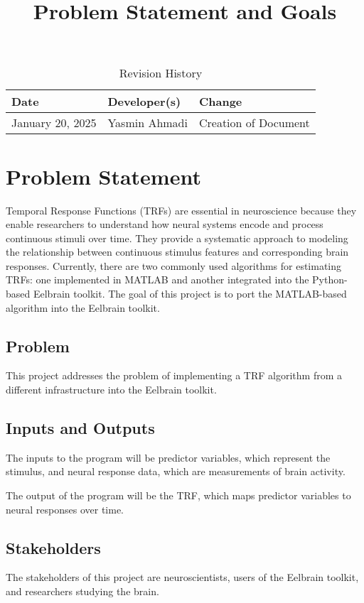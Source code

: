 \documentclass{article}
\title{Problem Statement and Goals\\\progname}
\author{\authname}
\date{}
\begin{document}
\maketitle

\begin{table}[hp]
\caption{Revision History} \label{TblRevisionHistory}
\begin{tabularx}{\textwidth}{llX}
\toprule
\textbf{Date} & \textbf{Developer(s)} & \textbf{Change}\\
\midrule
January 20, 2025 & Yasmin Ahmadi & Creation of Document\\


\bottomrule
\end{tabularx}
\end{table}

\section{Problem Statement}

Temporal Response Functions (TRFs) are essential in neuroscience because they enable researchers to understand how neural systems encode and process continuous stimuli over time. They provide a systematic approach to modeling the relationship between continuous stimulus features and corresponding brain responses. Currently, there are two commonly used algorithms for estimating TRFs: one implemented in MATLAB and another integrated into the Python-based Eelbrain toolkit. The goal of this project is to port the MATLAB-based algorithm into the Eelbrain toolkit.

\subsection{Problem}
This project addresses the problem of implementing a TRF algorithm from a different infrastructure into the Eelbrain toolkit.

\subsection{Inputs and Outputs}

The inputs to the program will be predictor variables, which represent the stimulus, and neural response data, which are measurements of brain activity.

The output of the program will be the TRF, which maps predictor variables to neural responses over time.

\subsection{Stakeholders}
The stakeholders of this project are neuroscientists, users of the Eelbrain toolkit, and researchers studying the brain.
\end{document}
